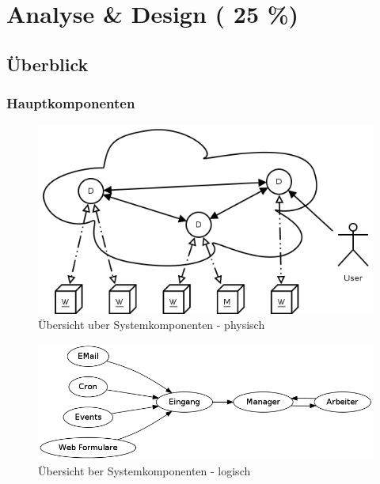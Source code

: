 \chapter{Analyse \& Design ( 25 \%)}


\section{\"Uberblick}
\subsection{Hauptkomponenten}


\begin{figure}[ht] 
  \label{fig:grob-layout-komponenten}
  \begin{center}
      \includegraphics[width=\textwidth]{imageinput/grob-layout-komponenten.png}
  \end{center}
  \caption{\"Ubersicht uber Systemkomponenten - physisch}
\end{figure}


\begin{figure}[ht]
  \label{fig:grob-layout-komponenten-logisch}
  \begin{center}
      \includegraphics[width=\textwidth]{imageinput/grob-layout-komponenten-logisch.png}
  \end{center}
  \caption{\"Ubersicht ber Systemkomponenten - logisch}
\end{figure}


